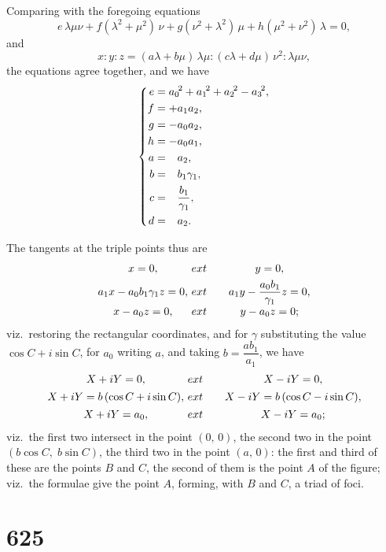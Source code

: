 \documentclass[11pt,a4paper]{book}
\begin{document}
Comparing with the foregoing equations
\[
e\,\lambda\mu\nu + f(\lambda^2+\mu^2)\,\nu + g(\nu^2+\lambda^2)\,\mu + h(\mu^2+\nu^2)\,\lambda = 0,
\]
and
\[
x:y:z = (a\lambda+b\mu)\,\lambda\mu : (c\lambda+d\mu)\,\nu^2 : \lambda\mu\nu,
\]
the equations agree together, and we have
\[
\left\{\begin{aligned}
e &= a_0{}^{\!2} + a_1{}^{\!2} + a_2{}^{\!2} - a_3{}^{\!2}, \\
f &= +a_1a_2, \\
g &= -a_0a_2, \\
h &= -a_0a_1, \\
a &= \hphantom{+}a_2, \\
b &= \hphantom{+}b_1\gamma_1, \\
c &= \hphantom{+}\frac{b_1}{\gamma_1}, \\
d &= \hphantom{+}a_2.
\end{aligned}\right.
\]

The tangents at the triple points thus are
\[
\begin{array}{c@{\	ext{\qquad}}c}
x = 0, & y = 0, \\[4pt]
a_1x - a_0b_1\gamma_1 z = 0, & a_1y - \dfrac{a_0b_1}{\gamma_1} z = 0, \\[6pt]
x - a_0z = 0, & y - a_0z = 0;
\end{array}
\]
viz.\ restoring the rectangular coordinates, and for $\gamma$ substituting the value $\cos C + i\sin C$, for $a_0$ writing $a$, and taking $b = \dfrac{ab_1}{a_1}$, we have
\[
\begin{array}{c@{\	ext{\qquad}}c}
X + iY = 0, & X - iY = 0, \\[4pt]
X + iY = b\, (\cos C + i\sin C), & X - iY = b\, (\cos C - i\sin C), \\[4pt]
X + iY = a_0, & X - iY = a_0;
\end{array}
\]
viz.\ the first two intersect in the point $(0,\,0)$, the second two in the point $(b\cos C,\; b\sin C)$, the third two in the point $(a,\,0)$: the first and third of these are the points $B$ and $C$, the second of them is the point $A$ of the figure; viz.\ the formulae give the point $A$, forming, with $B$ and $C$, a triad of foci.

\newpage


\section*{625}
\end{document}

